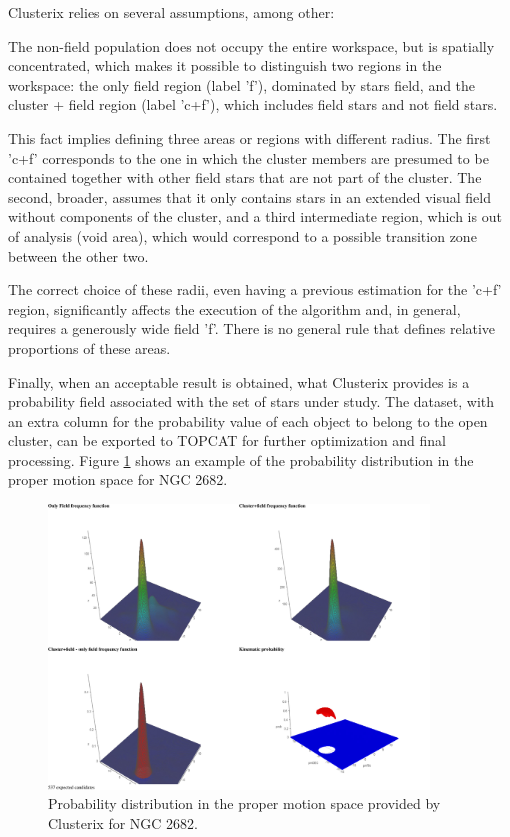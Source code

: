 \documentclass[11pt, a4paper, english]{book}
\begin{document}
Clusterix relies on several assumptions, among other:

\begin{displayquote}
The non-field population does not occupy the entire workspace, but is spatially concentrated, which makes it possible to distinguish two regions
in the workspace: the only field region (label 'f'), dominated by stars field, and the cluster + field region (label 'c+f'), which includes field
stars and not field stars. \cite{balaguer2020clusterix}
\end{displayquote}

This fact implies defining three areas or regions with different radius. The first 'c+f' corresponds to the one in which the cluster members are
presumed to be contained together with other field stars that are not part of the cluster. The second, broader, assumes that it only contains
stars in an extended visual field without components of the cluster, and a third intermediate region, which is out of analysis (void area), which
would correspond to a possible transition zone between the other two.

The correct choice of these radii, even having a previous estimation for the 'c+f' region, significantly affects the execution of the algorithm and,
in general, requires a generously wide field 'f'. There is no general rule that defines relative proportions of these areas.

Finally, when an acceptable result is obtained, what Clusterix provides is a probability field associated with the set of stars under study.
The dataset, with an extra column for the probability value of each object to belong to the open cluster, can be exported to TOPCAT
for further optimization and final processing. Figure \ref{fig:clusterix_probability} shows an example of the probability distribution in the proper
motion space for NGC 2682.

\begin{figure}[htbp]
  \centering
  \includegraphics[width=0.9\textwidth]{../figures/clusterix/statistics.pdf}
  \caption{Probability distribution in the proper motion space provided by Clusterix for NGC 2682.}
  \label{fig:clusterix_probability}
\end{figure}
\end{document}

